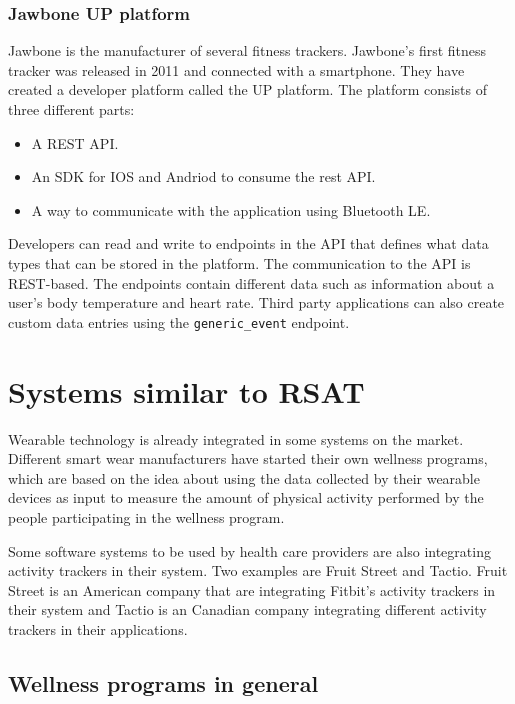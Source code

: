 \documentclass{cslthse-msc}
\begin{document}
\subsubsection{Jawbone UP platform}

Jawbone is the manufacturer of several fitness trackers. Jawbone's first fitness tracker was released in 2011 and connected with a smartphone\cite{guo2013evaluation}. They have created a developer platform called the UP platform. The platform consists of three different parts\cite{JawboneDeveloper}:

\begin{itemize}
\item A REST API.
\item An SDK for IOS and Andriod to consume the rest API.
\item A way to communicate with the application using Bluetooth LE.
\end{itemize}

Developers can read and write to endpoints in the API that defines what data types that can be stored in the platform. The communication to the API is REST-based. The endpoints contain different data such as information about a user's body temperature and heart rate. Third party applications can also create custom data entries using the \verb!generic_event! endpoint.\cite{JawboneCustomEndpoint}

\section{Systems similar to RSAT}

Wearable technology is already integrated in some systems on the market. Different smart wear manufacturers have started their own wellness programs, which are based on the idea about using the data collected by their wearable devices as input to measure the amount of physical activity performed by the people participating in the wellness program. 

Some software systems to be used by health care providers are also integrating activity trackers in their system. Two examples are Fruit Street and Tactio. Fruit Street is an American company that are integrating Fitbit's activity trackers in their system and Tactio is an Canadian company integrating different activity trackers in their applications.

\subsection{Wellness programs in general}
\label{sec:wellness-programs}
\end{document}
